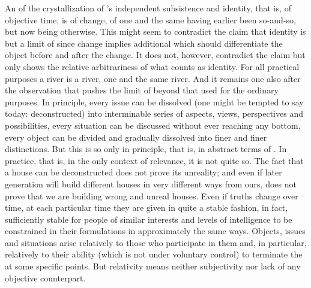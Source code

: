 \pa An  of the crystallization of 's independent
subsistence 
and identity, that is, of objective time, is  of change, of
one and the same  having earlier been so-and-so, but now being
otherwise.  This might seem to contradict the claim that identity is but a
limit of  since change implies additional 
which should differentiate the object before and after the change.  It does not,
however, contradict the claim but only shows the relative arbitrariness of what
counts as identity. For all practical purposes a river is a river, one and the
same river. And it remains one also after the observation that  pushes the limit of  beyond that used for the ordinary
purposes. In principle, every issue can be dissolved (one might be tempted to say
today: deconstructed) into interminable series of aspects, views, perspectives
and possibilities, every situation can be discussed  without
ever reaching any bottom, every object can be divided and gradually dissolved
into finer and finer distinctions. But this is so only in principle, that is, in
abstract terms of . In practice, that is, in the only
context of relevance, it is not quite so. 
The fact that a house can be deconstructed does not prove its unreality; and
even if later generation will build different houses in very different ways from
ours, does not prove that we are building wrong and unreal houses. Even if
 truths change over time, at each particular time they are given in
quite a stable fashion, in fact, sufficiently stable for people of similar
interests and levels of intelligence to be constrained in their formulations in
approximately the same ways. Objects, issues and situations arise relatively to those
who participate in them and, in particular, relatively to their ability (which
is not under voluntary control) to terminate the  at some
specific points. But relativity means neither subjectivity nor lack of any
objective counterpart.


